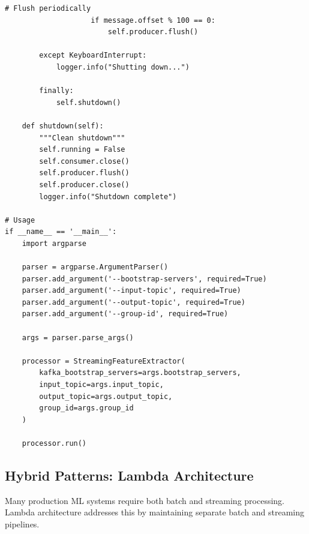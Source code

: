 \begin{lstlisting}[style=python, caption=Streaming Pipeline with Kafka]
                    # Flush periodically
                    if message.offset % 100 == 0:
                        self.producer.flush()

        except KeyboardInterrupt:
            logger.info("Shutting down...")

        finally:
            self.shutdown()

    def shutdown(self):
        """Clean shutdown"""
        self.running = False
        self.consumer.close()
        self.producer.flush()
        self.producer.close()
        logger.info("Shutdown complete")

# Usage
if __name__ == '__main__':
    import argparse

    parser = argparse.ArgumentParser()
    parser.add_argument('--bootstrap-servers', required=True)
    parser.add_argument('--input-topic', required=True)
    parser.add_argument('--output-topic', required=True)
    parser.add_argument('--group-id', required=True)

    args = parser.parse_args()

    processor = StreamingFeatureExtractor(
        kafka_bootstrap_servers=args.bootstrap_servers,
        input_topic=args.input_topic,
        output_topic=args.output_topic,
        group_id=args.group_id
    )

    processor.run()
\end{lstlisting}

\subsection{Hybrid Patterns: Lambda Architecture}

Many production ML systems require both batch and streaming processing. Lambda architecture addresses this by maintaining separate batch and streaming pipelines.

